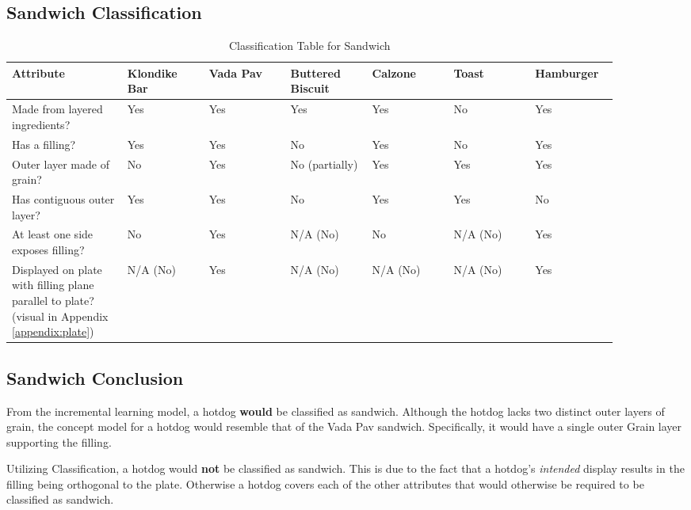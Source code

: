 \subsection{Sandwich Classification}
\begin{table}[H] %
	\caption{Classification Table for Sandwich}
	\small %
	\centering %
	\begin{tabular}{L{0.17\linewidth} L{0.12\linewidth} L{0.12\linewidth} L{0.12\linewidth} L{0.12\linewidth} L{0.12\linewidth} L{0.12\linewidth}}
		\textbf{Attribute} & \textbf{Klondike Bar} & \textbf{Vada Pav} & \textbf{Buttered Biscuit} & \textbf{Calzone} & \textbf{Toast} & \textbf{Hamburger} \\
		\toprule[0.5pt]
		Made from layered ingredients? & Yes & Yes & Yes &	Yes &	No & Yes\\
		\midrule
		Has a filling? & Yes &Yes&	No&	Yes&	No&	Yes\\
		\midrule
		Outer layer made of grain? & No&	Yes&	No (partially)&	Yes&	Yes&	Yes\\
		\midrule
		Has contiguous outer layer? & Yes&	Yes	&No&	Yes&	Yes&No\\
		\midrule
		At least one side exposes filling? & No&	Yes&	N/A (No)&	No&	N/A (No) &	Yes \\
		\midrule
		Displayed on plate with filling plane parallel to plate? (visual in Appendix \ref{appendix:plate}) & N/A (No)&	Yes&	N/A (No)&	N/A (No)&	N/A (No)&	Yes
	\end{tabular}
\end{table}


\subsection{Sandwich Conclusion}
From the incremental learning model, a hotdog \textbf{would} be classified as sandwich. Although the hotdog lacks two distinct outer layers of grain, the concept model for a hotdog would resemble that of the Vada Pav sandwich. Specifically, it would have a single outer Grain layer supporting the filling. 

Utilizing Classification, a hotdog would \textbf{not} be classified as sandwich. This is due to the fact that a hotdog's \textit{intended} display results in the filling being orthogonal to the plate. Otherwise a hotdog covers each of the other attributes that would otherwise be required to be classified as sandwich.

